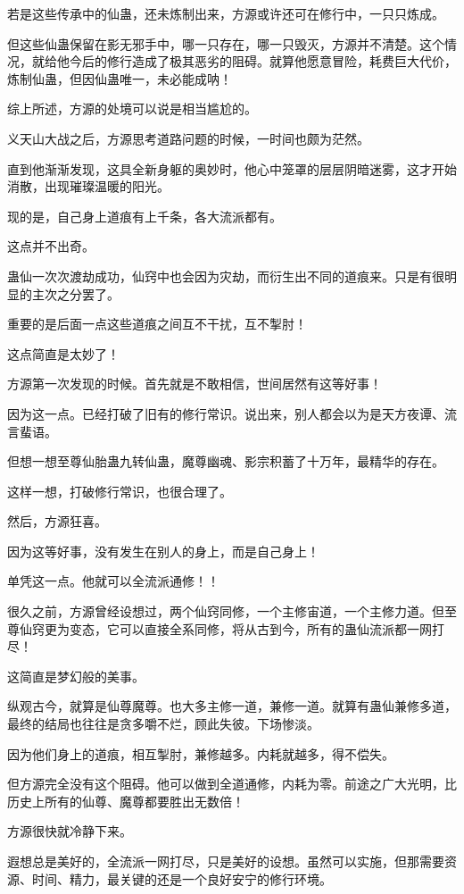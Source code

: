 \begin{this_body}
若是这些传承中的仙蛊，还未炼制出来，方源或许还可在修行中，一只只炼成。

但这些仙蛊保留在影无邪手中，哪一只存在，哪一只毁灭，方源并不清楚。这个情况，就给他今后的修行造成了极其恶劣的阻碍。就算他愿意冒险，耗费巨大代价，炼制仙蛊，但因仙蛊唯一，未必能成呐！

综上所述，方源的处境可以说是相当尴尬的。

义天山大战之后，方源思考道路问题的时候，一时间也颇为茫然。

直到他渐渐发现，这具全新身躯的奥妙时，他心中笼罩的层层阴暗迷雾，这才开始消散，出现璀璨温暖的阳光。

现的是，自己身上道痕有上千条，各大流派都有。

这点并不出奇。

蛊仙一次次渡劫成功，仙窍中也会因为灾劫，而衍生出不同的道痕来。只是有很明显的主次之分罢了。

重要的是后面一点这些道痕之间互不干扰，互不掣肘！

这点简直是太妙了！

方源第一次发现的时候。首先就是不敢相信，世间居然有这等好事！

因为这一点。已经打破了旧有的修行常识。说出来，别人都会以为是天方夜谭、流言蜚语。

但想一想至尊仙胎蛊九转仙蛊，魔尊幽魂、影宗积蓄了十万年，最精华的存在。

这样一想，打破修行常识，也很合理了。

然后，方源狂喜。

因为这等好事，没有发生在别人的身上，而是自己身上！

单凭这一点。他就可以全流派通修！！

很久之前，方源曾经设想过，两个仙窍同修，一个主修宙道，一个主修力道。但至尊仙窍更为变态，它可以直接全系同修，将从古到今，所有的蛊仙流派都一网打尽！

这简直是梦幻般的美事。

纵观古今，就算是仙尊魔尊。也大多主修一道，兼修一道。就算有蛊仙兼修多道，最终的结局也往往是贪多嚼不烂，顾此失彼。下场惨淡。

因为他们身上的道痕，相互掣肘，兼修越多。内耗就越多，得不偿失。

但方源完全没有这个阻碍。他可以做到全道通修，内耗为零。前途之广大光明，比历史上所有的仙尊、魔尊都要胜出无数倍！

方源很快就冷静下来。

遐想总是美好的，全流派一网打尽，只是美好的设想。虽然可以实施，但那需要资源、时间、精力，最关键的还是一个良好安宁的修行环境。


\end{this_body}
